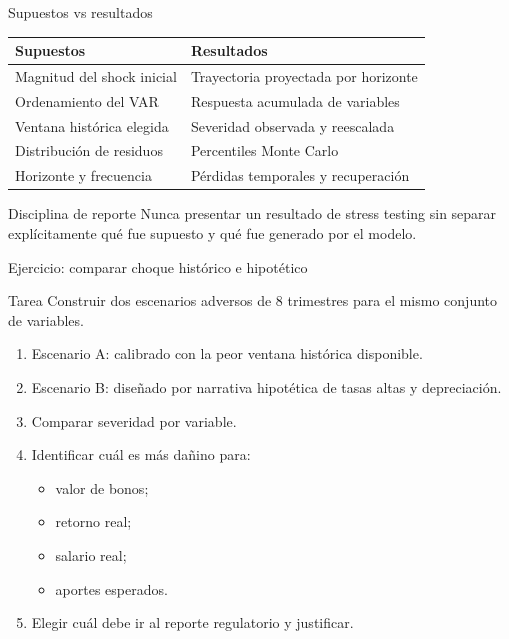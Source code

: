 \documentclass[10pt,aspectratio=169]{beamer}
\begin{document}
\begin{frame}{Supuestos vs resultados}
\begin{table}
\small
\begin{tabular}{p{4.2cm}p{6.8cm}}
\toprule
Supuestos & Resultados \\
\midrule
Magnitud del shock inicial & Trayectoria proyectada por horizonte \\
Ordenamiento del VAR & Respuesta acumulada de variables \\
Ventana histórica elegida & Severidad observada y reescalada \\
Distribución de residuos & Percentiles Monte Carlo \\
Horizonte y frecuencia & Pérdidas temporales y recuperación \\
\bottomrule
\end{tabular}
\end{table}

\begin{block}{Disciplina de reporte}
Nunca presentar un resultado de stress testing sin separar explícitamente qué fue supuesto y qué fue generado por el modelo.
\end{block}
\end{frame}

\begin{frame}{Ejercicio: comparar choque histórico e hipotético}
\begin{block}{Tarea}
Construir dos escenarios adversos de 8 trimestres para el mismo conjunto de variables.
\end{block}

\begin{enumerate}
  \item Escenario A: calibrado con la peor ventana histórica disponible.
  \item Escenario B: diseñado por narrativa hipotética de tasas altas y depreciación.
  \item Comparar severidad por variable.
  \item Identificar cuál es más dañino para:
  \begin{itemize}
    \item valor de bonos;
    \item retorno real;
    \item salario real;
    \item aportes esperados.
  \end{itemize}
  \item Elegir cuál debe ir al reporte regulatorio y justificar.
\end{enumerate}
\end{frame}
\end{document}
